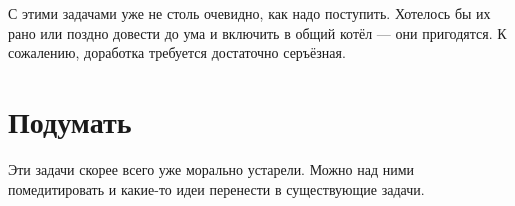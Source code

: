 С этими задачами уже не столь очевидно, как надо поступить. Хотелось бы их
рано или поздно довести до ума и включить в общий котёл --- они пригодятся.
К сожалению, доработка требуется достаточно серъёзная.







\chapter{Подумать} %

Эти задачи скорее всего уже морально устарели. Можно над ними помедитировать
и какие-то идеи перенести в существующие задачи.




